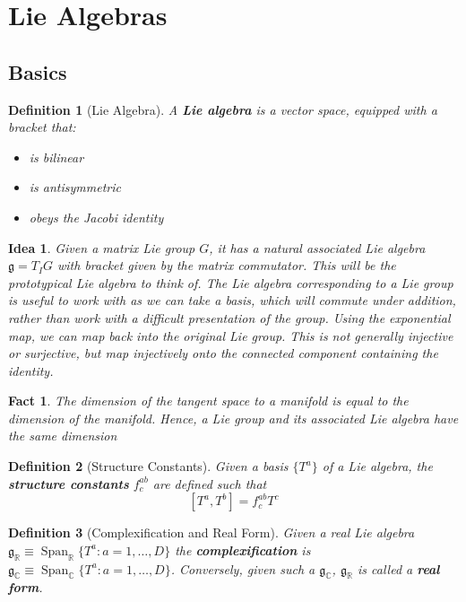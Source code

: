 \documentclass{article}
\newtheorem{definition}{Definition}[subsection]
\newtheorem{fact}{Fact}[subsection]
\newtheorem*{idea}{Idea}
\DeclareMathOperator{\spn}{Span}
\newcommand{\bam}[1]{\textbf{#1}}
\newcommand{\mf}[1]{\mathfrak{#1}}
\newcommand{\comm}[2][]{\left[ #1, #2 \right]}
\newcommand{\set}[1]{\lbrace #1 \rbrace}
\begin{document}
\section{Lie Algebras}

\subsection{Basics}

\begin{definition}[Lie Algebra] 

A \bam{Lie algebra} is a vector space, equipped with a bracket that:
\begin{itemize}
    \item is bilinear
    \item is antisymmetric
    \item obeys the Jacobi identity
\end{itemize}
\end{definition}

\begin{idea}
Given a matrix Lie group $G$, it has a natural associated Lie algebra $\mf{g}=T_{I}G$ with bracket given by the matrix commutator. This will be the prototypical Lie algebra to think of. The Lie algebra corresponding to a Lie group is useful to work with as we can take a basis, which will commute under addition, rather than work with a difficult presentation of the group.
Using the exponential map, we can map back into the original Lie group. This is not generally injective or surjective, but map injectively onto the connected component containing the identity. 
\end{idea}

\begin{fact}
The dimension of the tangent space to a manifold is equal to the dimension of the manifold. Hence, a Lie group and its associated Lie algebra have the same dimension
\end{fact}

\begin{definition}[Structure Constants]
Given a basis $\set{T^a}$ of a Lie algebra, the \bam{structure constants} $f^{ab}_c$ are defined such that 
\[
\comm[T^a]{T^b}=f^{ab}_c T^c
\]
\end{definition}

\begin{definition}[Complexification and Real Form]
Given a  real Lie algebra $\mf{g}_\mathbb{R}\equiv\spn_{\mathbb{R}}\set{ T^a : a=1, \dots, D }$ the \bam{complexification}
is $\mf{g}_\mathbb{C}\equiv\spn_{\mathbb{C}}\set{ T^a : a=1, \dots, D }$. Conversely, given such a $\mf{g}_\mathbb{C}$, $\mf{g}_\mathbb{R}$ is called a \bam{real form}.  
\end{definition}
\end{document}
